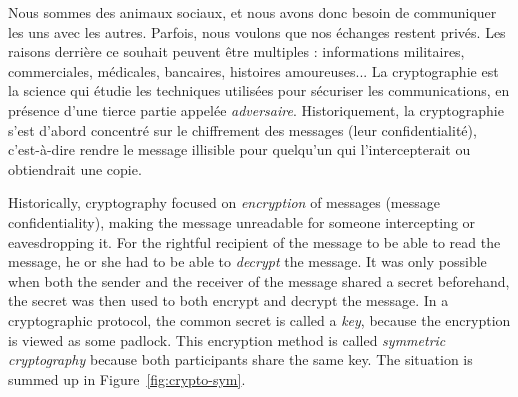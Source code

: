 Nous sommes des animaux sociaux, et nous avons donc besoin de communiquer les
uns avec les autres. Parfois, nous voulons que nos échanges restent privés.
Les raisons derrière ce souhait peuvent être multiples : informations
militaires, commerciales, médicales, bancaires, histoires amoureuses... La
cryptographie est la science qui étudie les techniques utilisées pour sécuriser
les communications, en présence d'une tierce partie appelée \emph{adversaire}.
Historiquement, la cryptographie s'est d'abord concentré sur le chiffrement des
messages (leur confidentialité), c'est-à-dire rendre le message illisible pour
quelqu'un qui l'intercepterait ou obtiendrait une copie.

Historically, cryptography
focused on \emph{encryption} of messages (message confidentiality), \ie making
the message unreadable for someone intercepting or eavesdropping it. For the
rightful recipient of the message to be able to read the message, he or she had
to be able to \emph{decrypt} the message. It was
only possible when both the sender and the receiver of the message shared a
secret beforehand, the secret was then used to both encrypt and decrypt the
message. In a cryptographic protocol, the common secret is called a
\emph{key}, because the encryption is viewed as some padlock. This encryption
method is called \emph{symmetric cryptography} because both participants share
the same key. The situation is summed up in Figure~\ref{fig:crypto-sym}.
